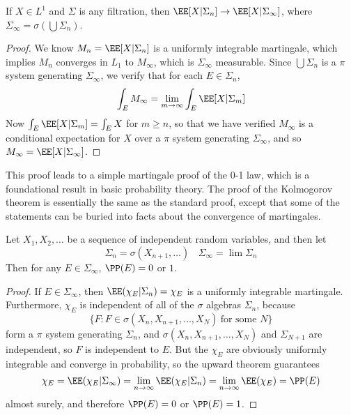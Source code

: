 \begin{theorem}
    If $X \in L^1$ and $\Sigma$ is any filtration, then $\EE[X|\Sigma_n] \to \EE[X|\Sigma_\infty]$, where $\Sigma_\infty = \sigma(\bigcup \Sigma_n)$.
\end{theorem}
\begin{proof}
    We know $M_n = \EE[X|\Sigma_n]$ is a uniformly integrable martingale, which implies $M_n$ converges in $L_1$ to $M_\infty$, which is $\Sigma_\infty$ measurable. Since $\bigcup \Sigma_n$ is a $\pi$ system generating $\Sigma_\infty$, we verify that for each $E \in \Sigma_n$,
    \[ \int_E M_\infty = \lim_{m \to \infty} \int_E \EE[X|\Sigma_m] \]
    Now $\int_E \EE[X|\Sigma_m] = \int_E X$ for $m \geq n$, so that we have verified $M_\infty$ is a conditional expectation for $X$ over a $\pi$ system generating $\Sigma_\infty$, and so $M_\infty = \EE[X|\Sigma_\infty]$.
\end{proof}

This proof leads to a simple martingale proof of the 0-1 law, which is a foundational result in basic probability theory. The proof of the Kolmogorov theorem is essentially the same as the standard proof, except that some of the statements can be buried into facts about the convergence of martingales.

\begin{corollary}
    Let $X_1, X_2, \dots$ be a sequence of independent random variables, and then let
    \[ \Sigma_n = \sigma(X_{n+1}, \dots)\ \ \ \ \Sigma_\infty = \lim \Sigma_n \]
    Then for any $E \in \Sigma_\infty$, $\PP(E) = 0$ or $1$.
\end{corollary}
\begin{proof}
    If $E \in \Sigma_\infty$, then $\EE(\chi_E | \Sigma_n) = \chi_E$ is a uniformly integrable martingale. Furthermore, $\chi_E$ is independent of all of the $\sigma$ algebras $\Sigma_n$, because
    \[ \{ F: F \in \sigma(X_n, X_{n+1}, \dots, X_N)\ \text{for some $N$} \} \]
    form a $\pi$ system generating $\Sigma_n$, and $\sigma(X_n,X_{n+1}, \dots, X_N)$ and $\Sigma_{N+1}$ are independent, so $F$ is independent to $E$. But the $\chi_E$ are obviously uniformly integrable and converge in probability, so the upward theorem guarantees
    \[ \chi_E = \EE(\chi_E|\Sigma_\infty) = \lim_{n \to \infty} \EE(\chi_E|\Sigma_n) = \lim_{n \to \infty} \EE(\chi_E) = \PP(E) \]
    almost surely, and therefore $\PP(E) = 0$ or $\PP(E) = 1$.
\end{proof}

